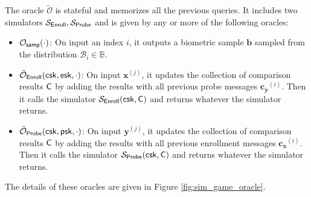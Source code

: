 The oracle $\tilde{\mathcal{O}}$ is stateful and memorizes all the previous queries. It includes two simulators $\mathcal{S}_{\sf Enroll}, \mathcal{S}_{\sf Probe}$ and is given by any or more of the following oracles:

\begin{itemize}

	\item $\mathcal{O}_{\sf samp}(\cdot)$: On input an index $i$, it outputs a biometric sample $\mathbf{b}$ sampled from the distribution $\mathcal{B}_i \in \mathbb{B}$.
	
	\item $\tilde{\mathcal{O}}_{\sf Enroll} ({\sf csk} ,{\sf esk}, \cdot)$: On input $\mathbf{x}^{(j)}$, it updates the collection of comparison results ${\sf C}$ by adding the results with all previous probe messages $\mathbf{c_y}^{(i)}$. Then it calls the simulator $\mathcal{S}_{\sf Enroll}({\sf csk}, {\sf C})$ and returns whatever the simulator returns.

	\item $\tilde{\mathcal{O}}_{\sf Probe} ({\sf csk}, {\sf psk}, \cdot)$: On input $\mathbf{y}^{(j)}$, it updates the collection of comparison results ${\sf C}$ by adding the results with all previous enrollment messages $\mathbf{c_x}^{(i)}$. Then it calls the simulator $\mathcal{S}_{\sf Probe}({\sf csk}, {\sf C})$ and returns whatever the simulator returns.

\end{itemize}

The details of these oracles are given in Figure \ref{fig:sim_game_oracle}.

